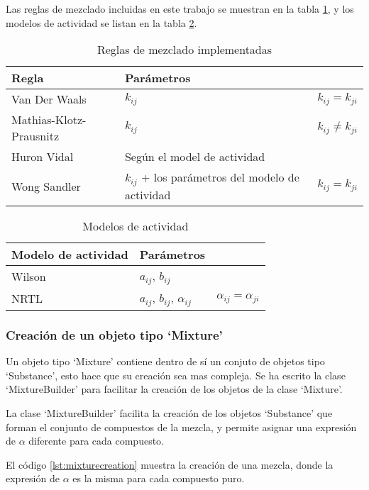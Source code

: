 Las reglas de mezclado incluidas en este trabajo se muestran en la tabla \ref{tab:mixingrules}, y los modelos de actividad se listan en la tabla \ref{tab:activitymodels}.

\begin{table}[!h]
	\caption{Reglas de mezclado implementadas}\label{tab:mixingrules}
	\begin{tabularx}{\textwidth}{|X|X|X|}
		\hline
		Regla & Parámetros & \\
		\hline
		Van Der Waals & $k_{ij}$ & $k_{ij} = k_{ji}$ \\
		Mathias-Klotz-Prausnitz& $k_{ij}$ & $k_{ij} \neq k_{ji}$ \\
		Huron Vidal & Según el model de actividad & \\
		Wong Sandler & $k_{ij}$ + los parámetros del modelo de actividad & $k_{ij} = k_{ji}$ \\
		\hline
	\end{tabularx}
\end{table}

\begin{table}[!h]
	\caption{Modelos de actividad }\label{tab:activitymodels}
	\begin{tabularx}{\textwidth}{|X|X|X|}
		\hline
		Modelo de actividad & Parámetros & \\
		\hline
		Wilson & $a_{ij}$, $b_{ij}$  & \\
		NRTL & $a_{ij}$, $b_{ij}$, $\alpha_{ij}$ & $\alpha_{ij} = \alpha_{ji}$ \\
		\hline
	\end{tabularx}
\end{table}
\subsubsection{Creación de un objeto tipo `Mixture'}\label{subsub:mixtureCreation}

Un objeto tipo `Mixture' contiene dentro de sí un conjuto de objetos tipo `Substance', esto hace que su creación sea mas compleja. Se ha escrito la clase `MixtureBuilder' para facilitar la creación de los objetos de la clase `Mixture'.

La clase `MixtureBuilder' facilita la creación de los objetos `Substance' que forman el conjunto de compuestos de la mezcla, y permite asignar una expresión de $\alpha$ diferente para cada compuesto.

El código \ref{lst:mixturecreation} muestra la creación de una mezcla, donde la expresión de $\alpha$ es la misma para cada compuesto puro. 

